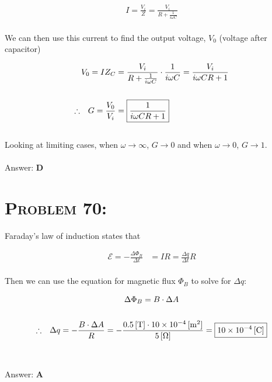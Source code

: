 \documentclass{article}
\providecommand{\e}[1]{\ensuremath{\times 10^{#1}}}
\begin{document}
\begin{align}
I = \frac{V_i}{Z} = \frac{V_i}{R + \frac{1}{i \omega C}}\nonumber
\end{align}
\\
We can then use this current to find the output voltage, $V_{0}$ (voltage after capacitor)

\begin{align}
V_{0} = I Z_{C} &= \frac{V_i}{R + \frac{1}{i \omega C}} \cdot \frac{1}{i \omega C} = \frac{V_i}{i \omega C R + 1}\nonumber\\
\nonumber\\
\therefore \hspace{.1in} G = \frac{V_{0}}{V_{i}} &= \boxed{\frac{1}{i \omega C R + 1}}\nonumber
\end{align}
\\
Looking at limiting cases, when $\omega \rightarrow \infty$, $G \rightarrow 0$ and when $\omega \rightarrow 0$, $G \rightarrow 1$.
\\\\
Answer: \textbf{\textcolor{ProcessBlue}D}\\


\section{\textsc{Problem 70:}} Faraday's law of induction states that

\begin{align}
\mathcal{E} = - \frac{\Delta \Phi_{B}}{\Delta t} &= IR = \frac{\Delta q}{\Delta t} R
\end{align}
\\
Then we can use the equation for magnetic flux $\Phi_{B}$ to solve for $\Delta q$:

\begin{gather}
\Delta \Phi_{B} = B \cdot \Delta A\\
\nonumber\\
\therefore \hspace{.1in} \Delta q = -\frac{B \cdot \Delta A}{R} = -\frac{\unit[0.5]{[T]} \cdot \unit[10\e{-4}]{[m^{2}]}}{\unit[5]{[\Omega]}} = \boxed{\unit[10\e{-4}]{[C]}}\nonumber
\end{gather}
\\\\
Answer: \textbf{\textcolor{ProcessBlue}A}\\

\end{document}
